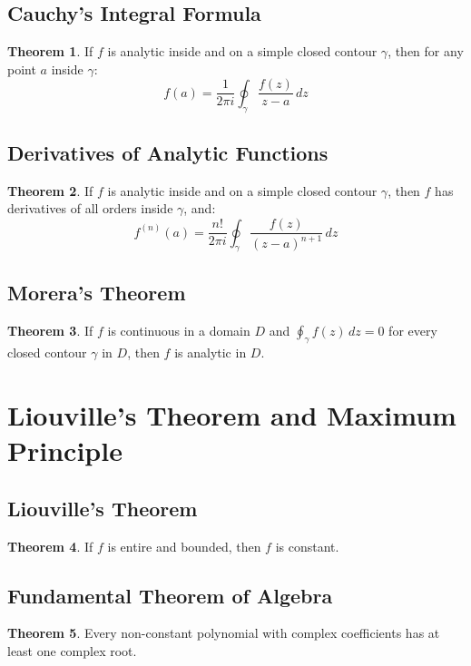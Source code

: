 \documentclass[11pt]{article}
\theoremstyle{definition}
\newtheorem{theorem}{Theorem}[section]
\begin{document}
\subsection{Cauchy's Integral Formula}
\begin{theorem}
If $f$ is analytic inside and on a simple closed contour $\gamma$, then for any point $a$ inside $\gamma$:
$$f(a) = \frac{1}{2\pi i} \oint_\gamma \frac{f(z)}{z - a} \, dz$$
\end{theorem}

\subsection{Derivatives of Analytic Functions}
\begin{theorem}
If $f$ is analytic inside and on a simple closed contour $\gamma$, then $f$ has derivatives of all orders inside $\gamma$, and:
$$f^{(n)}(a) = \frac{n!}{2\pi i} \oint_\gamma \frac{f(z)}{(z - a)^{n+1}} \, dz$$
\end{theorem}

\subsection{Morera's Theorem}
\begin{theorem}
If $f$ is continuous in a domain $D$ and $\oint_\gamma f(z) \, dz = 0$ for every closed contour $\gamma$ in $D$, then $f$ is analytic in $D$.
\end{theorem}

\section{Liouville's Theorem and Maximum Principle}

\subsection{Liouville's Theorem}
\begin{theorem}
If $f$ is entire and bounded, then $f$ is constant.
\end{theorem}

\subsection{Fundamental Theorem of Algebra}
\begin{theorem}
Every non-constant polynomial with complex coefficients has at least one complex root.
\end{theorem}
\end{document}
